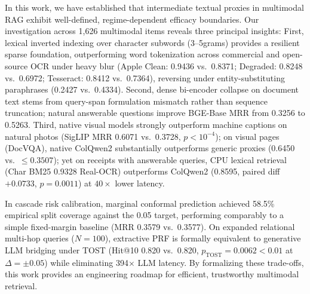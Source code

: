 In this work, we have established that intermediate textual proxies in multimodal RAG exhibit well-defined, regime-dependent efficacy boundaries. Our investigation across 1,626 multimodal items reveals three principal insights: First, lexical inverted indexing over character subwords (3--5grams) provides a resilient sparse foundation, outperforming word tokenization across commercial and open-source OCR under heavy blur (Apple Clean: 0.9436 vs.\ 0.8371; Degraded: 0.8248 vs.\ 0.6972; Tesseract: 0.8412 vs.\ 0.7364), reversing under entity-substituting paraphrases (0.2427 vs.\ 0.4334). Second, dense bi-encoder collapse on document text stems from query-span formulation mismatch rather than sequence truncation; natural answerable questions improve BGE-Base MRR from 0.3256 to 0.5263. Third, native visual models strongly outperform machine captions on natural photos (SigLIP MRR 0.6071 vs.\ 0.3728, $p < 10^{-4}$); on visual pages (DocVQA), native ColQwen2 substantially outperforms generic proxies (0.6450 vs.\ $\le 0.3507$); yet on receipts with answerable queries, CPU lexical retrieval (Char BM25 0.9328 Real-OCR) outperforms ColQwen2 (0.8595, paired diff $+0.0733$, $p=0.0011$) at $40\times$ lower latency.

In cascade risk calibration, marginal conformal prediction achieved 58.5\% empirical split coverage against the 0.05 target, performing comparably to a simple fixed-margin baseline (MRR 0.3579 vs.\ 0.3577). On expanded relational multi-hop queries ($N=100$), extractive PRF is formally equivalent to generative LLM bridging under TOST (Hit@10 0.820 vs.\ 0.820, $p_{\text{TOST}}=0.0062 < 0.01$ at $\Delta=\pm 0.05$) while eliminating 394$\times$ LLM latency. By formalizing these trade-offs, this work provides an engineering roadmap for efficient, trustworthy multimodal retrieval.

\appendices
